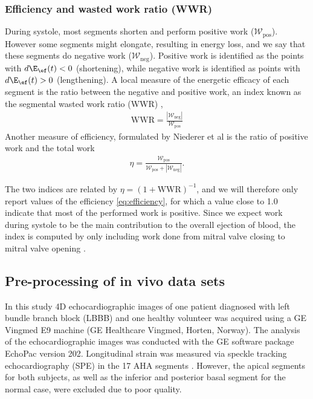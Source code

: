 \subsubsection{Efficiency and wasted work ratio (WWR)}
\label{sec:efficiency_wwr}

During systole, most segments shorten and perform positive work
($\mathcal{W}_{\mathrm{pos}}$). However some segments might elongate,
resulting in energy loss, and we say that these segments do negative work
($\mathcal{W}_{\mathrm{neg}}$). Positive work is identified as the points with
$d\E_{\ef}(t) < 0$ (shortening), while negative work is identified as points with
$d\E_{\ef}(t) > 0$ (lengthening).
A local measure of the energetic efficacy of each segment is the ratio between the
negative and positive work, an index known as the segmental wasted
work ratio (WWR) \cite{russell2013assessment},
\begin{align}
  \mathrm{WWR} = \frac{|\mathcal{W}_{\mathrm{neg}}|}{\mathcal{W}_{\mathrm{pos}}}
\end{align}
Another measure of efficiency, formulated by Niederer et al
\cite{niederer2009role} is the ratio of positive work and the total
work
\begin{align}
  \eta = \frac{\mathcal{W}_{\mathrm{pos}}}{\mathcal{W}_{\mathrm{pos}} + |\mathcal{W}_{\mathrm{neg}}|}.
  \label{eq:efficiency}
\end{align}

The two indices are related by $\eta = \left( 1 +
  \mathrm{WWR} \right)^{-1}$, and we will therefore only report values
of the efficiency \eqref{eq:efficiency}, for which a value close to 1.0 indicate that most
of the performed work is positive. Since we expect work during systole
to be the main contribution to the overall ejection of blood, the
index is computed by only including work done from mitral valve closing to
mitral valve opening \cite{russell2013assessment}. 


\subsection{Pre-processing of in vivo data sets}

In this study 4D echocardiographic images of one patient diagnosed
with left bundle branch block (LBBB) and one healthy volunteer was
acquired using a GE Vingmed E9 machine (GE Healthcare Vingmed, Horten,
Norway). 
The analysis of the echocardiographic images was conducted with the
GE software package EchoPac version 202. Longitudinal strain was
measured via speckle tracking echocardiography (SPE) in the 17 AHA segments
\cite{cerqueira2002standardized}. However, the apical segments for both
subjects, as well as the inferior and posterior basal segment for the
normal case, were excluded due to poor quality.


